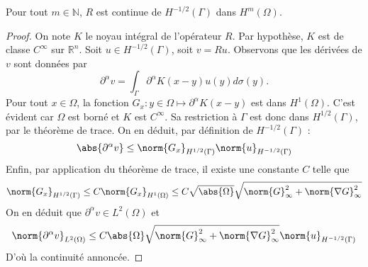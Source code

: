 \documentclass[11pt,a4paper]{article}
\begin{document}
\begin{Lem*} Pour tout $m \in \mathbb{N}$, $R$ est continue de $H^{-1/2}(\Gamma)$ dans $H^{m}(\Omega)$.
\begin{proof}
On note $K$ le noyau intégral de l'opérateur $R$. Par hypothèse, $K$ est de classe $C^{\infty}$ sur $\mathbb{R}^n$. 
Soit $u \in H^{-1/2}(\Gamma)$, soit $v= Ru$. Observons que les dérivées de $v$ sont données par 
\[\partial^{\alpha} v = \int_{\Gamma} \partial^\alpha K(x-y)u(y) d\sigma(y).\]
Pour tout $x \in \Omega$, la fonction $G_x : y \in \Omega \mapsto \partial^\alpha K(x-y)$ est dans $H^1(\Omega)$. C'est évident car $\Omega$ est borné et $K$ est $C^{\infty}$. Sa restriction à $\Gamma$ est donc dans $H^{1/2}(\Gamma)$, par le théorème de trace. On en déduit, par définition de $H^{-1/2}(\Gamma)$ : 
\[\abs{\partial^\alpha v} \leq \norm{G_x}_{H^{1/2}(\Gamma)}\norm{u}_{H^{-1/2}(\Gamma)}\] 
Enfin, par application du théorème de trace, il existe une constante $C$ telle que
\[\norm{G_x}_{H^{1/2}(\Gamma)} \leq C \norm{G_x}_{H^{1}(\Omega)} \leq C \sqrt{\abs{\Omega}}\sqrt{\norm{G}_{\infty}^2+\norm{\nabla G}_\infty^2}\]
On en déduit que $\partial^\alpha v \in L^2(\Omega)$ et 
\[ \norm{\partial^\alpha v}_{L^2(\Omega)} \leq C \abs{\Omega}\sqrt{\norm{G}_{\infty}^2+\norm{\nabla G}_\infty^2} \norm{u}_{H^{-1/2}(\Gamma)}\] 
D'où la continuité annoncée. 
\end{proof}
\end{Lem*}





 
\end{document}
